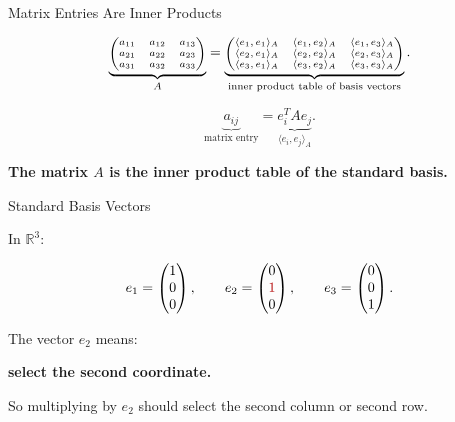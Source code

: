 \documentclass[10pt]{beamer}
\theoremstyle{definition}
\newcommand{\x}[1]{\alert{\textbf{#1}}}
\newcommand{\rd}[1]{{\color{red!70!black}#1}}
\begin{document}
\begin{frame}{Matrix Entries Are Inner Products}

\[
\scriptsize
\underbrace{
\begin{pmatrix}
a_{11}&a_{12}&a_{13}\\
a_{21}&a_{22}&a_{23}\\
a_{31}&a_{32}&a_{33}
\end{pmatrix}}_{A}
=
\underbrace{
\begin{pmatrix}
\langle e_1,e_1\rangle_A&\langle e_1,e_2\rangle_A&\langle e_1,e_3\rangle_A\\
\langle e_2,e_1\rangle_A&\langle e_2,e_2\rangle_A&\langle e_2,e_3\rangle_A\\
\langle e_3,e_1\rangle_A&\langle e_3,e_2\rangle_A&\langle e_3,e_3\rangle_A
\end{pmatrix}}_{\text{inner product table of basis vectors}}.
\]

\vfill

\[
\boxed{\underbrace{a_{ij}}_{\text{matrix entry}}
=
\underbrace{e_i^TAe_j}_{\langle e_i,e_j\rangle_A}.}
\]

\vfill

\begin{center}
\x{The matrix $A$ is the inner product table of the standard basis.}
\end{center}

\end{frame}


\begin{frame}{Standard Basis Vectors}

In $\mathbb R^3$:

$$
e_1=\begin{pmatrix}1\\0\\0\end{pmatrix},
\qquad
e_2=\begin{pmatrix}0\\\rd{1}\\0\end{pmatrix},
\qquad
e_3=\begin{pmatrix}0\\0\\1\end{pmatrix}.
$$

\vfill

The vector $e_2$ means:

\begin{center}
\x{select the second coordinate.}
\end{center}

\vfill

So multiplying by $e_2$ should select the second column or second row.

\end{frame}
\end{document}
